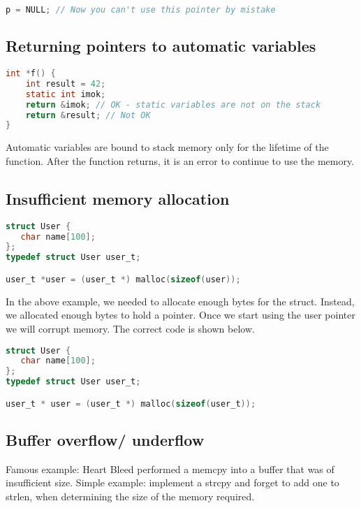 \begin{lstlisting}[language=C]
p = NULL; // Now you can't use this pointer by mistake
\end{lstlisting}

\subsection{Returning pointers to automatic variables}

\begin{lstlisting}[language=C]
int *f() {
    int result = 42;
    static int imok;
    return &imok; // OK - static variables are not on the stack
    return &result; // Not OK
}
\end{lstlisting}

Automatic variables are bound to stack memory only for the lifetime of the function.
After the function returns, it is an error to continue to use the memory.

\subsection{Insufficient memory allocation}

\begin{lstlisting}[language=C]
struct User {
   char name[100];
};
typedef struct User user_t;

user_t *user = (user_t *) malloc(sizeof(user));
\end{lstlisting}

In the above example, we needed to allocate enough bytes for the struct.
Instead, we allocated enough bytes to hold a pointer.
Once we start using the user pointer we will corrupt memory.
The correct code is shown below.

\begin{lstlisting}[language=C]
struct User {
   char name[100];
};
typedef struct User user_t;

user_t * user = (user_t *) malloc(sizeof(user_t));
\end{lstlisting}

\subsection{Buffer overflow/ underflow}

Famous example: Heart Bleed performed a memcpy into a buffer that was of insufficient size.
Simple example: implement a strcpy and forget to add one to strlen, when determining the size of the memory required.


